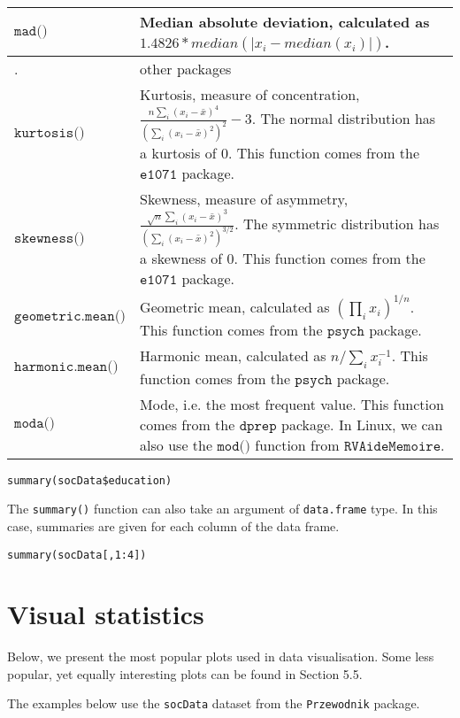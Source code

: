 \documentclass[]{book}
\theoremstyle{definition}
\theoremstyle{definition}
\theoremstyle{definition}
\theoremstyle{remark}
\begin{document}
\begin{table}
\begin{tabular}[t]{>{}l||>{\raggedright\arraybackslash}p{35em}}
\hline
$\texttt{mad()}$ & Median absolute deviation, calculated as $1.4826*median(|x_i-median(x_i)|)$.\\
\hline
. & other packages\\
\hline
$\texttt{kurtosis()}$ & Kurtosis, measure of concentration, $\frac{n\sum_i(x_i-\bar{x})^4}{(\sum_i(x_i-\bar{x})^2)^2}-3$. The normal distribution has a kurtosis of 0. This function comes from the $\texttt{e1071}$ package.\\
\hline
$\texttt{skewness()}$ & Skewness, measure of asymmetry, $\frac{\sqrt{n}\sum_i(x_i-\bar{x})^3}{(\sum_i(x_i-\bar{x})^2)^{3/2}}$. The symmetric distribution has a skewness of 0. This function comes from the $\texttt{e1071}$ package.\\
\hline
$\texttt{geometric.mean()}$ & Geometric mean, calculated as $(\prod_ix_i)^{1/n}$. This function comes from the $\texttt{psych}$ package.\\
\hline
$\texttt{harmonic.mean()}$ & Harmonic mean, calculated as $n/\sum_ix_i^{-1}$. This function comes from the $\texttt{psych}$ package.\\
\hline
$\texttt{moda()}$ & Mode, i.e. the most frequent value. This function comes from the $\texttt{dprep}$ package. In Linux, we can also use the $\texttt{mod()}$ function from $\texttt{RVAideMemoire}$.\\
\hline
\end{tabular}
\end{table}

\begin{verbatim}
summary(socData$education)
\end{verbatim}

The \texttt{summary()} function can also take an argument of
\texttt{data.frame} type. In this case, summaries are given for each
column of the data frame.

\begin{verbatim}
summary(socData[,1:4])
\end{verbatim}

\section{Visual statistics}\label{part_24}

Below, we present the most popular plots used in data visualisation.
Some less popular, yet equally interesting plots can be found in Section
5.5.

The examples below use the \texttt{socData} dataset from the
\texttt{Przewodnik} package.
\end{document}
